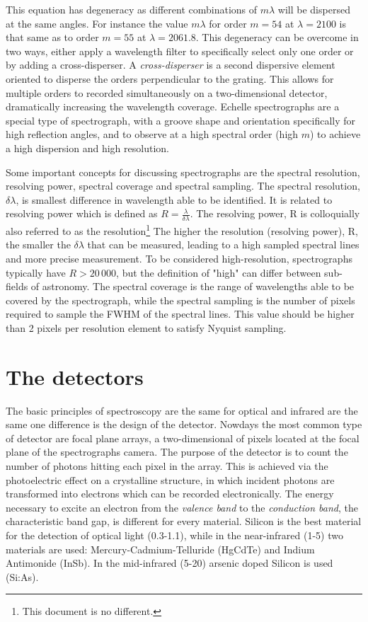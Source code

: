 This equation has degeneracy as different combinations of $m \lambda$ will be dispersed at the same angles.
For instance the value $m \lambda$ for order $m=54$ at $\lambda=2100$\nm{} is that same as to order $m=55$ at $\lambda=2061.8$\nm{}.
This degeneracy can be overcome in two ways, either apply a wavelength filter to specifically select only one order or by adding a cross-disperser.
A \emph{cross-disperser} is a second dispersive element oriented to disperse the orders perpendicular to the grating.
This allows for multiple orders to recorded simultaneously on a two-dimensional detector, dramatically increasing the wavelength coverage.
Echelle spectrographs are a special type of spectrograph, with a groove shape and orientation specifically for high reflection angles, and to observe at a high spectral order (high $m$) to achieve a high dispersion and high resolution.

Some important concepts for discussing spectrographs are the spectral resolution, resolving power, spectral coverage and spectral sampling.
The spectral resolution, \(\delta \lambda\), is smallest difference in wavelength able to be identified.
It is related to resolving power which is defined as \(R=\frac{\lambda}{\delta\lambda}\).
The resolving power, R is colloquially also referred to as the resolution\footnote{This document is no different.} The higher the resolution (resolving power), R, the smaller the \(\delta\lambda\) that can be measured, leading to a high sampled spectral lines and more precise measurement.
To be considered high-resolution, spectrographs typically have \(R>20\,000\), but the definition of "high" can differ between sub-fields of astronomy.
The spectral coverage is the range of wavelengths able to be covered by the spectrograph, while the spectral sampling is the number of pixels required to sample the FWHM of the spectral lines.
This value should be higher than 2 pixels per resolution element to satisfy Nyquist sampling.


\section{The detectors}
The basic principles of spectroscopy are the same for optical and infrared are the same one difference is the design of the detector.
Nowdays the most common type of detector are focal plane arrays, a two-dimensional of pixels located at the focal plane of the spectrographs camera. The purpose of the detector is to count the number of photons hitting each pixel in the array. This is achieved via the photoelectric effect on a crystalline structure, in which incident photons are transformed into electrons which can be recorded electronically. The energy necessary to excite an electron from the \emph{valence band} to the \emph{conduction band}, the characteristic band gap, is different for every material. Silicon is the best material for the detection of optical light (0.3-1.1\um), while in the near-infrared (1-5\um) two materials are used: {Mercury-Cadmium-Telluride} (\si{HgCdTe}) and {Indium Antimonide} (\si{InSb}). In the mid-infrared (5-20\um) arsenic doped Silicon is used (\si{Si}:\si{As}).

